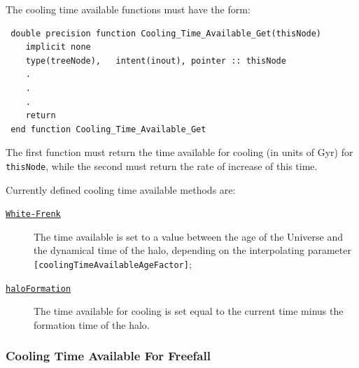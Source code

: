 The cooling time available functions must have the form:
\begin{verbatim}
 double precision function Cooling_Time_Available_Get(thisNode)
    implicit none
    type(treeNode),   intent(inout), pointer :: thisNode
    .
    .
    .
    return
 end function Cooling_Time_Available_Get
\end{verbatim}
The first function must return the time available for cooling (in units of Gyr) for {\tt thisNode}, while the second must return the rate of increase of this time. 

Currently defined cooling time available methods are:
\begin{description}
 \item [\hyperlink{cooling.time_available.White-Frenk.F90:cooling_time_available_white_frenk:cooling_time_available_wf}{{\tt White-Frenk}}] The time available is set to a value between the age of the Universe and the dynamical time of the halo, depending on the interpolating parameter {\tt [coolingTimeAvailableAgeFactor]};
 \item [\hyperlink{cooling.time_available.halo_formation.F90:cooling_times_available_halo_formation:cooling_time_available_halo_formation}{{\tt haloFormation}}] The time available for cooling is set equal to the current time minus the formation time of the halo.
\end{description}

\subsubsection{Cooling Time Available For Freefall}

